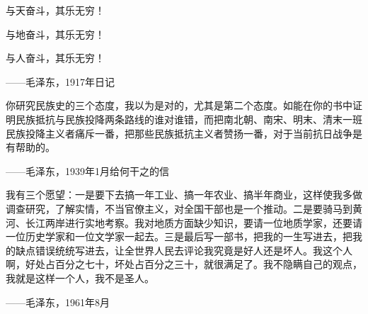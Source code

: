 \documentclass[../dazhuan.tex]{subfiles}
\begin{document}

\thispagestyle{empty}
    
\kaishu

与天奋斗，其乐无穷！

与地奋斗，其乐无穷！

与人奋斗，其乐无穷！

\hspace{6em} ——毛泽东，1917年日记

\vspace{2\baselineskip}

你研究民族史的三个态度，我以为是对的，尤其是第二个态度。如能在你的书中证明民族抵抗与民族投降两条路线的谁对谁错，而把南北朝、南宋、明末、清末一班民族投降主义者痛斥一番，把那些民族抵抗主义者赞扬一番，对于当前抗日战争是有帮助的。

\hspace{6em} ——毛泽东，1939年1月给何干之的信

\vspace{2\baselineskip}

我有三个愿望：一是要下去搞一年工业、搞一年农业、搞半年商业，这样使我多做调查研究，了解实情，不当官僚主义，对全国干部也是一个推动。二是要骑马到黄河、长江两岸进行实地考察。我对地质方面缺少知识，要请一位地质学家，还要请一位历史学家和一位文学家一起去。三是最后写一部书，把我的一生写进去，把我的缺点错误统统写进去，让全世界人民去评论我究竟是好人还是坏人。我这个人啊，好处占百分之七十，坏处占百分之三十，就很满足了。我不隐瞒自己的观点，我就是这样一个人，我不是圣人。

\hspace{6em} ——毛泽东，1961年8月

\normalfont
\end{document}
